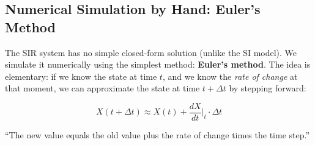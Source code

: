 \subsection{Numerical Simulation by Hand: Euler's Method}

The SIR system has no simple closed-form solution (unlike the SI model). We simulate it numerically using the simplest method: \textbf{Euler's method}. The idea is elementary: if we know the state at time $t$, and we know the \emph{rate of change} at that moment, we can approximate the state at time $t + \Delta t$ by stepping forward:

\[
X(t + \Delta t) \approx X(t) + \frac{dX}{dt}\bigg|_t \cdot \Delta t
\]

``The new value equals the old value plus the rate of change times the time step.''

